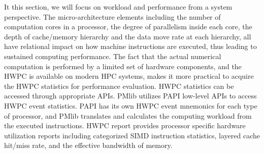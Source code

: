 \documentclass[conference]{IEEEtran}
\begin{document}
It this section, we will focus on workload and performance from
a system perspective.
The micro-architecture elements including the number of computation cores
in a processor, the degree of parallelism inside each core,
the depth of cache/memory hierarchy and the data move rate at each hierarchy,
all have relational impact on how machine instructions are executed,
thus leading to sustained computing performance.
The fact that the actual numerical computation is performed by a
limited set of hardware components, and the HWPC is available
on modern HPC systems, makes it more practical to acquire the HWPC statistics
for performance evaluation.
HWPC statistics can be accessed through appropriate APIs.
PMlib utilizes PAPI low-level APIs to access HWPC event statistics.
PAPI has its own HWPC event mnemonics for each type of processor,
and PMlib translates and
calculates the computing workload from the executed instructions.
HWPC report provides processor specific hardware utilization reports
including categorized SIMD instruction statistics, layered cache
hit/miss rate, and the effective bandwidth of memory.
\end{document}
